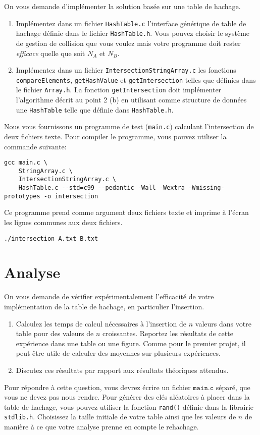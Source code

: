 \documentclass[a4paper,10pt]{article}
\begin{document}
On vous demande d'implémenter la solution basée sur une table de
hachage.

\begin{enumerate}
\item Implémentez dans un fichier \texttt{HashTable.c} l'interface générique de table de hachage définie dans le fichier \texttt{HashTable.h}.
  Vous pouvez choisir le système de gestion de collision
  que vous voulez mais votre programme doit rester {\it efficace} quelle
  que soit $N_A$ et $N_B$.
\item Implémentez dans un fichier \texttt{IntersectionStringArray.c} les fonctions \texttt{compareElements}, \texttt{getHashValue} et \texttt{getIntersection} telles que définies dans le fichier \texttt{Array.h}. La fonction \texttt{getIntersection} doit implémenter l'algorithme décrit au point 2 (b) en utilisant comme structure de données une \texttt{HashTable} telle que définie dans \texttt{HashTable.h}.
\end{enumerate}

Nous vous fournissons un programme de test (\texttt{main.c}) calculant l'intersection de deux fichiers texte.
Pour compiler le programme, vous pouvez utiliser la commande suivante:

\begin{verbatim}
gcc main.c \
    StringArray.c \
    IntersectionStringArray.c \
    HashTable.c --std=c99 --pedantic -Wall -Wextra -Wmissing-prototypes -o intersection
\end{verbatim}

Ce programme prend comme argument deux fichiers texte et imprime à l'écran les lignes communes aux deux fichiers.

\begin{verbatim}
./intersection A.txt B.txt
\end{verbatim}

\section{Analyse}

On vous demande de vérifier expérimentalement l'efficacité de votre
implémentation de la table de hachage, en particulier l'insertion.
\begin{enumerate}
\item Calculez les temps de calcul nécessaires à l'insertion de $n$
  valeurs dans votre table pour des valeurs de $n$
  croissantes. Reportez les résultats de cette expérience dans une
  table ou une figure. Comme pour le premier projet, il peut être
  utile de calculer des moyennes sur plusieurs expériences.
\item Discutez ces résultats par rapport aux résultats théoriques attendus.
\end{enumerate}

Pour répondre à cette question, vous devrez écrire un fichier
$\texttt{main.c}$ séparé, que vous ne devez pas nous rendre. Pour
générer des clés aléatoires à placer dans la table de hachage, vous
pouvez utiliser la fonction \texttt{rand()} définie dans la librairie \texttt{stdlib.h}. Choisissez la taille
initiale de votre table ainsi que les valeurs de $n$ de manière à ce
que votre analyse prenne en compte le rehachage.
\end{document}
